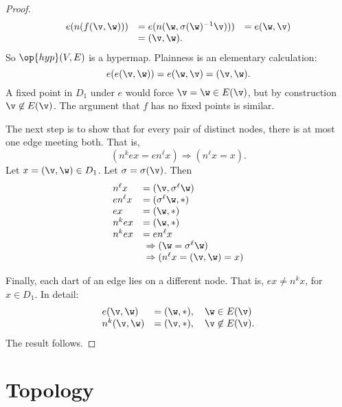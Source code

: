 \begin{proof}  
\begin{displaymath}
\begin{array}{lll}
e(n(f(\v,\w))) &= e(n(\w,\sigma(\w)^{-1} \v))) &=
e(\w,\v)\\ 
&= (\v,\w).
\end{array}
\end{displaymath}
So $\op{hyp}(V,E)$ is a hypermap. 
Plainness is an elementary calculation:
\begin{displaymath}e(e(\v,\w)) = e(\w,\v) = (\v,\w).\end{displaymath}
A fixed point in $D_1$ under $e$ would force $\v = \w\in E(\v)$,
but by construction $\v\not\in E(\v)$.  The argument that $f$ has no
fixed points is similar.

The next step is to show that for every pair of distinct nodes, there
is at most one edge meeting both.  That is,
\begin{displaymath}(n^k e x = e n^\ell x)\Rightarrow (n^\ell x =
x).\end{displaymath} Let $x = (\v,\w)\in D_1$.  Let
$\sigma=\sigma(\v)$. Then
\begin{displaymath}
\begin{array}{lllllll}
n^\ell x &= (\v,\sigma^\ell \w)\\
e n^\ell x &= (\sigma^\ell \w,*)\\
e x &= (\w,*)\\
n^k e x &= (\w,*)\\
n^k e x &= e n^\ell x \\&\ \Rightarrow (\w = \sigma^\ell \w) \\&\ \Rightarrow
(n^\ell x = (\v,\w) = x)
\end{array}
\end{displaymath}

Finally,  each dart of an edge lies on a different node.
That is, $e x \ne n^k x$, for $x\in D_1$.   In detail:
\begin{displaymath}
\begin{array}{lll}
e(\v,\w) &= (\w,*),\quad \w\in E(\v)\\
n^k(\v,\w) &= (\v,*),\quad \v\not\in E(\v).
\end{array}
\end{displaymath}
The result follows.
\end{proof}

\section{Topology}\label{sec:topology}

